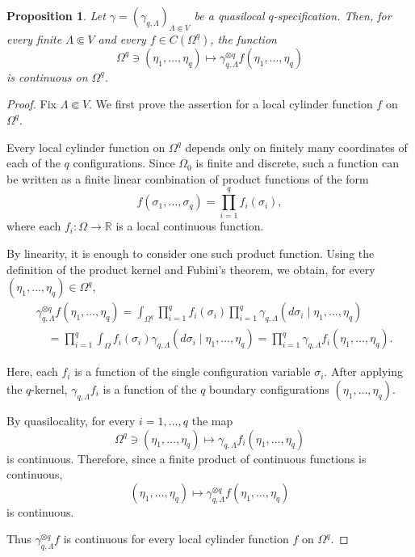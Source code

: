 \documentclass[11pt,reqno]{amsart}
\newtheorem{pro}{Proposition}
\numberwithin{equation}{section} \setcounter{tocdepth}{1}
\begin{document}
\begin{pro}\label{pc}
	Let $\gamma=(\gamma_{q,\Lambda})_{\Lambda\Subset V}$ be a
	quasilocal $q$-specification. Then, for every finite
	$\Lambda\Subset V$ and every $f\in C(\Omega^q)$, the function
	\[
	\Omega^q\ni(\eta_1,\ldots,\eta_q)
	\longmapsto
	\gamma_{q,\Lambda}^{\otimes q}f
	(\eta_1,\ldots,\eta_q)
	\]
	is continuous on $\Omega^q$.
\end{pro}

\begin{proof}
	Fix $\Lambda\Subset V$. We first prove the assertion for a local
	cylinder function $f$ on $\Omega^q$.
	
	Every local cylinder function on $\Omega^q$ depends only on finitely
	many coordinates of each of the $q$ configurations. Since $\Omega_0$
	is finite and discrete, such a function can be written as a finite
	linear combination of product functions of the form
	\[
	f(\sigma_1,\ldots,\sigma_q)
	=
	\prod_{i=1}^q f_i(\sigma_i),
	\]
	where each $f_i:\Omega\to\mathbb R$
	is a local continuous function.
	
	By linearity, it is enough to consider one such product function.
	Using the definition of the product kernel and Fubini's theorem,
	we obtain, for every
	$(\eta_1,\ldots,\eta_q)\in\Omega^q$,
	\begin{align*}
		&\gamma_{q,\Lambda}^{\otimes q}f
		(\eta_1,\ldots,\eta_q)
		=
		\int_{\Omega^q}
		\prod_{i=1}^q f_i(\sigma_i)
		\prod_{i=1}^q
		\gamma_{q,\Lambda}
		(d\sigma_i\mid\eta_1,\ldots,\eta_q)
		\\
		&\quad=
		\prod_{i=1}^q
		\int_\Omega
		f_i(\sigma_i)
		\gamma_{q,\Lambda}
		(d\sigma_i\mid\eta_1,\ldots,\eta_q)
		=
		\prod_{i=1}^q
		\gamma_{q,\Lambda}f_i
		(\eta_1,\ldots,\eta_q).
	\end{align*}
	
	Here, each $f_i$ is a function of the single configuration
	variable $\sigma_i$. After applying the $q$-kernel,
	$\gamma_{q,\Lambda}f_i$ is a function of the $q$ boundary
	configurations $(\eta_1,\ldots,\eta_q)$.
	
	By quasilocality, for every $i=1,\ldots,q$ the map
	\[
	\Omega^q\ni(\eta_1,\ldots,\eta_q)
	\longmapsto
	\gamma_{q,\Lambda}f_i
	(\eta_1,\ldots,\eta_q)
	\]
	is continuous. Therefore, since a finite product of continuous
	functions is continuous,
	\[
	(\eta_1,\ldots,\eta_q)
	\longmapsto
	\gamma_{q,\Lambda}^{\otimes q}f
	(\eta_1,\ldots,\eta_q)
	\]
	is continuous.
	
	Thus $\gamma_{q,\Lambda}^{\otimes q}f$ is continuous for every
	local cylinder function $f$ on $\Omega^q$.
	

\end{proof}
\end{document}
